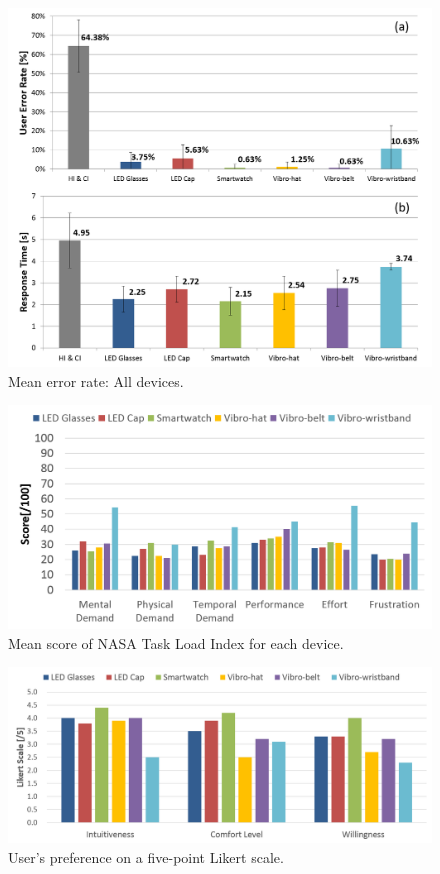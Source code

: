 \documentclass{sigchi}
\begin{document}
\begin{figure}[!t]
\centering
\includegraphics[width=\columnwidth]{stage2_ER&RT}
\caption{Mean error rate: All devices.}
\label{fig:stage2_ER&RT}
\end{figure}

\begin{figure}[!t]
\centering
\includegraphics[width=\columnwidth]{stage2_TLX}
\caption{Mean score of NASA Task Load Index for each device.}
\label{fig:nasa_tlx}
\end{figure}

\begin{figure}[!t]
\centering
\includegraphics[width=\columnwidth]{stage2_Likert}
\caption{User's preference on a five-point Likert scale.}
\label{fig:likert_scale}
\end{figure}
\end{document}
